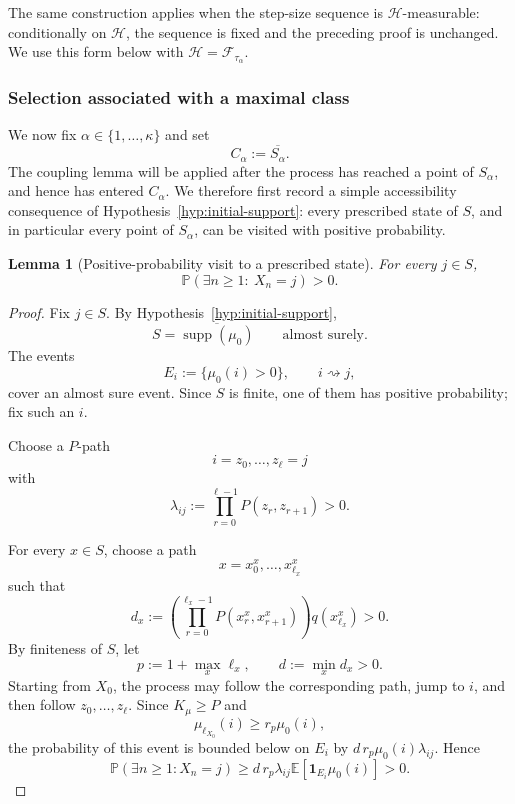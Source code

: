 \documentclass[10pt,letterpaper]{article}
\theoremstyle{compactplain}
\newtheorem{lemma}[theorem]{Lemma}
\theoremstyle{compactdefinition}
\DeclareMathOperator{\supp}{supp}
\newcommand{\1}{\mathds{1}}
\begin{document}
The same construction applies when the step-size sequence is
\(\mathcal H\)-measurable: conditionally on \(\mathcal H\), the sequence is fixed and the preceding proof is unchanged. We use this form below with
\(\mathcal H=\mathcal F_{\tau_\alpha}\).


\subsubsection{Selection associated with a maximal class}

We now fix \(\alpha\in\{1,\ldots,\kappa\}\) and set
\[
C_\alpha:=\overline{S_\alpha}.
\]
The coupling lemma will be applied after the process has reached a point of
\(S_\alpha\), and hence has entered \(C_\alpha\). We therefore first record a
simple accessibility consequence of Hypothesis~\ref{hyp:initial-support}: every
prescribed state of \(S\), and in particular every point of \(S_\alpha\), can be
visited with positive probability.
\begin{lemma}[Positive-probability visit to a prescribed state]
\label{lem:visit-accessible}
For every \(j\in S\),
\[
\mathbb P(\exists n\geq1:\ X_n=j)>0.
\]
\end{lemma}


\begin{proof}
Fix \(j\in S\). By Hypothesis~\ref{hyp:initial-support},
\[
S=\overline{\supp(\mu_0)}
\qquad\text{almost surely}.
\]
The events
\[
E_i:=\{\mu_0(i)>0\},
\qquad i\rightsquigarrow j,
\]
cover an almost sure event. Since \(S\) is finite, one of them has positive probability; fix such an \(i\).

Choose a \(P\)-path
\[
i=z_0,\ldots,z_\ell=j
\]
with
\[
\lambda_{ij}:=\prod_{r=0}^{\ell-1}P(z_r,z_{r+1})>0.
\]



For every \(x\in S\), choose a path
\[
x=x_0^x,\ldots,x_{\ell_x}^x
\]
such that
\[
d_x
:=
\left(\prod_{r=0}^{\ell_x-1}
P(x_r^x,x_{r+1}^x)\right)q(x_{\ell_x}^x)>0.
\]
By finiteness of \(S\), let
\[
p:=1+\max_x\ell_x,
\qquad
d:=\min_x d_x>0.
\]
Starting from \(X_0\), the process may follow the corresponding path, jump to
\(i\), and then follow \(z_0,\ldots,z_\ell\). Since
\(K_\mu\geq P\) and
\[
\mu_{\ell_{X_0}}(i)\geq r_p\mu_0(i),
\]
the probability of this event is bounded below on \(E_i\) by
\(d\,r_p\mu_0(i)\lambda_{ij}\). Hence
\[
\mathbb P(\exists n\geq1:X_n=j)
\geq
d\,r_p\lambda_{ij}
\mathbb E[\mathbf1_{E_i}\mu_0(i)]
>0.
\]

\end{proof}
\end{document}
